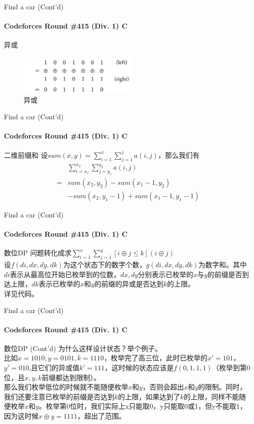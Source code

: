 \documentclass[hyperref={unicode=true}]{beamer}
\theoremstyle{definition}
\theoremstyle{proof}
\begin{document}
\begin{frame}{Find a car (Cont'd)}\framesubtitle{Codeforces Round \#415 (Div. 1) C}
  \begin{block}{异或}
    \begin{figure}
      \includegraphics[width=2.3in]{figures/xor.png}
      \caption{异或}\label{fig:xor}
    \end{figure}
  \end{block}
\end{frame}

\begin{frame}{Find a car (Cont'd)}\framesubtitle{Codeforces Round \#415 (Div. 1) C}
  \begin{block}{二维前缀和}
    设$sum(x,y)=\sum_{i=1}^x \sum_{j=1}^j a(i,j)$，那么我们有
    \begin{align}
      &\sum_{i=x_1}^{x_2} \sum_{j=y_1}^{y_2} a(i,j)\\
      =&sum(x_2,y_2)-sum(x_1-1,y_2)\\
      &-sum(x_2,y_1-1)+sum(x_1-1,y_1-1)
      \end{align}
  \end{block}
\end{frame}

\begin{frame}{Find a car (Cont'd)}\framesubtitle{Codeforces Round \#415 (Div. 1) C}
  \begin{exampleblock}{数位DP}
    问题转化成求$\sum_{i=1}^{x}\sum_{j=1}^{y}[i\oplus j\leq k](i \oplus j)$\\
    设$f(di,dx,dy,dk)$为这个状态下的数字个数，$g(di,dx,dy,dk)$为数字和。其中$di$表示从最高位开始已枚举到的位数，$dx,dy$分别表示已枚举的$x$与$y$的前缀是否到达上限，$dk$表示已枚举的$x$和$y$的前缀的异或是否达到$k$的上限。\\
    详见代码。
  \end{exampleblock}
\end{frame}

\begin{frame}{Find a car (Cont'd)}\framesubtitle{Codeforces Round \#415 (Div. 1) C}
  \begin{exampleblock}{数位DP (Cont'd)}
    为什么这样设计状态？举个例子。\\
    比如$x=1010,y=0101,k=1110$，枚举完了高三位，此时已枚举的$x'=101$，$y'=010$,且它们的异或值$k'=111$，这时候的状态应该是$f(0,1,1,1)$（枚举到第0位，且$x,y,k$前缀都达到限制）。\\
    那么我们枚举低位的时候就不能随便枚举$x$和$y$，否则会超出$x$和$y$的限制。同时，我们还要注意已枚举的前缀是否达到$k$的上限，如果达到了$k$的上限，同样不能随便枚举$x$和$y$。枚举第0位时，我们实际上x只能取0，y只能取0或1，但y不能取1，因为这时候$x\oplus y=1111$，超出了范围。
  \end{exampleblock}
\end{frame}
\end{document}

